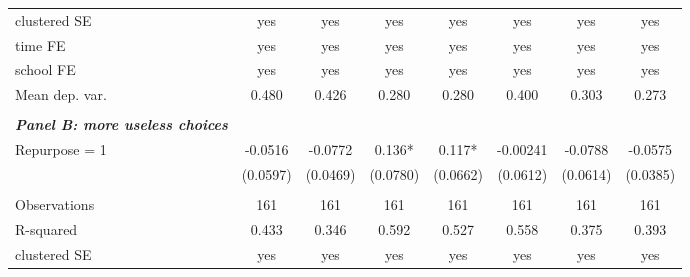 \documentclass[12pt]{article}
\theoremstyle{plain}
\theoremstyle{plain}
\theoremstyle{plain}
\theoremstyle{definition}
\theoremstyle{plain}
\theoremstyle{definition}
\theoremstyle{plain}
\theoremstyle{remark}
\theoremstyle{definition}
\theoremstyle{definition}
\theoremstyle{plain}
\begin{document}
\begin{table}[H]
{\begin{tabular}{p{12.39em}lllllll}
			\multicolumn{1}{l}{clustered SE} & \multicolumn{1}{c}{yes} & \multicolumn{1}{c}{yes} & \multicolumn{1}{c}{yes} & \multicolumn{1}{c}{yes} & \multicolumn{1}{c}{yes} & \multicolumn{1}{c}{yes} & \multicolumn{1}{c}{yes} \\
			\multicolumn{1}{l}{time FE} & \multicolumn{1}{c}{yes} & \multicolumn{1}{c}{yes} & \multicolumn{1}{c}{yes} & \multicolumn{1}{c}{yes} & \multicolumn{1}{c}{yes} & \multicolumn{1}{c}{yes} & \multicolumn{1}{c}{yes} \\
			\multicolumn{1}{l}{school FE} & \multicolumn{1}{c}{yes} & \multicolumn{1}{c}{yes} & \multicolumn{1}{c}{yes} & \multicolumn{1}{c}{yes} & \multicolumn{1}{c}{yes} & \multicolumn{1}{c}{yes} & \multicolumn{1}{c}{yes} \\
			\multicolumn{1}{l}{Mean dep. var.} & \multicolumn{1}{c}{0.480} & \multicolumn{1}{c}{0.426} & \multicolumn{1}{c}{0.280} & \multicolumn{1}{c}{0.280} & \multicolumn{1}{c}{0.400} & \multicolumn{1}{c}{0.303} & \multicolumn{1}{c}{0.273} \\
			\midrule
			\multicolumn{1}{r}{} &       &       &       &       &       &       &  \\
			\multicolumn{1}{l}{\textit{\textbf{Panel B: more useless choices}}} &       &       &       &       &       &       &  \\
			\multicolumn{1}{l}{Repurpose = 1} & \multicolumn{1}{c}{-0.0516} & \multicolumn{1}{c}{-0.0772} & \multicolumn{1}{c}{0.136*} & \multicolumn{1}{c}{0.117*} & \multicolumn{1}{c}{-0.00241} & \multicolumn{1}{c}{-0.0788} & \multicolumn{1}{c}{-0.0575} \\
			\multicolumn{1}{l}{} & \multicolumn{1}{c}{(0.0597)} & \multicolumn{1}{c}{(0.0469)} & \multicolumn{1}{c}{(0.0780)} & \multicolumn{1}{c}{(0.0662)} & \multicolumn{1}{c}{(0.0612)} & \multicolumn{1}{c}{(0.0614)} & \multicolumn{1}{c}{(0.0385)} \\
			\multicolumn{1}{r}{} &       &       &       &       &       &       &  \\
			\multicolumn{1}{l}{Observations} & \multicolumn{1}{c}{161} & \multicolumn{1}{c}{161} & \multicolumn{1}{c}{161} & \multicolumn{1}{c}{161} & \multicolumn{1}{c}{161} & \multicolumn{1}{c}{161} & \multicolumn{1}{c}{161} \\
			\multicolumn{1}{l}{R-squared} & \multicolumn{1}{c}{0.433} & \multicolumn{1}{c}{0.346} & \multicolumn{1}{c}{0.592} & \multicolumn{1}{c}{0.527} & \multicolumn{1}{c}{0.558} & \multicolumn{1}{c}{0.375} & \multicolumn{1}{c}{0.393} \\
			\multicolumn{1}{l}{clustered SE} & \multicolumn{1}{c}{yes} & \multicolumn{1}{c}{yes} & \multicolumn{1}{c}{yes} & \multicolumn{1}{c}{yes} & \multicolumn{1}{c}{yes} & \multicolumn{1}{c}{yes} & \multicolumn{1}{c}{yes} \\

\end{tabular}}
\end{table}
\end{document}
